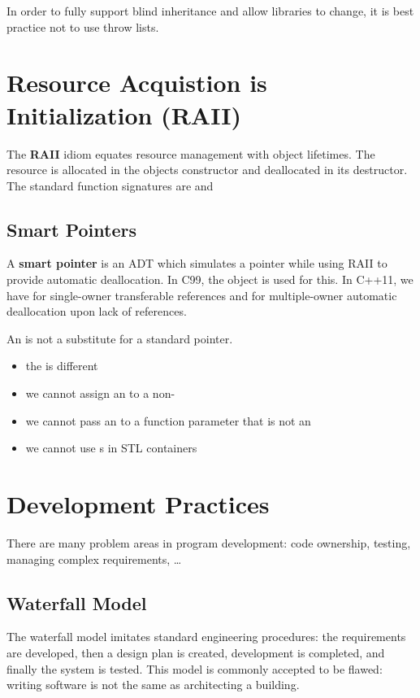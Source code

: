\documentclass[12pt]{article}
\begin{document}
In order to fully support blind inheritance and allow libraries to change, it is best practice not to use throw lists.

\section{Resource Acquistion is Initialization (RAII)}
The {\bf RAII} idiom equates resource management with object lifetimes. The resource is allocated in the objects constructor and deallocated in its destructor. The standard function signatures are  and 

\subsection{Smart Pointers}
A {\bf smart pointer} is an ADT which simulates a pointer while using RAII to provide automatic deallocation. In C99, the  object is used for this. In C++11, we have  for single-owner transferable references and  for multiple-owner automatic deallocation upon lack of references.

An  is not a substitute for a standard pointer.
\begin{itemize}
\item the  is different
\item we cannot assign an  to a non-
\item we cannot pass an  to a function parameter that is not an 
\item we cannot use s in STL containers
\end{itemize}


\section{Development Practices}
There are many problem areas in program development: code ownership, testing, managing complex requirements, \dots

\subsection{Waterfall Model}
The waterfall model imitates standard engineering procedures: the requirements are developed, then a design plan is created, development is completed, and finally the system is tested. This model is commonly accepted to be flawed: writing software is not the same as architecting a building.
\end{document}
